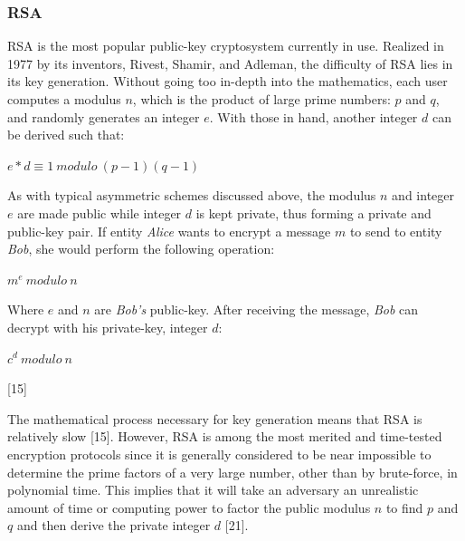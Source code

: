 \documentclass[conference,compsoc]{IEEEtran}
\begin{document}
\subsubsection{RSA}
RSA is the most popular public-key cryptosystem currently in use. Realized in 1977 by its inventors, Rivest, Shamir, and Adleman, the difficulty of RSA lies in its key generation. Without going too in-depth into the mathematics, each user computes a modulus $n$, which is the product of large prime numbers: $p$ and $q$, and randomly generates an integer $e$. With those in hand, another integer $d$ can be derived such that:\\

\begin{center}
\large $e * d \equiv 1~ modulo~ (p-1)(q-1)$
\break
\end{center}

As with typical asymmetric schemes discussed above, the modulus $n$ and integer $e$ are made public while integer $d$ is kept private, thus forming a private and public-key pair. If entity \emph{Alice} wants to encrypt a message $m$ to send to entity \emph{Bob}, she would perform the following operation:\\

\begin{center}
\large $m^e~ modulo~ n$ 
\break
\end{center}

Where $e$ and $n$ are \emph{Bob’s} public-key. After receiving the message, \emph{Bob} can decrypt with his private-key, integer $d$:\\

\begin{center}
\large $c^d~ modulo~ n$
\end {center}

\hfill [15]
\break

The mathematical process necessary for key generation means that RSA is relatively slow [15]. However, RSA is among the most merited and time-tested encryption protocols since it is generally considered to be near impossible to determine the prime factors of a very large number, other than by brute-force, in polynomial time. This implies that it will take an adversary an unrealistic amount of time or computing power to factor the public modulus $n$ to find $p$ and $q$ and then derive the private integer $d$ [21].
\end{document}
